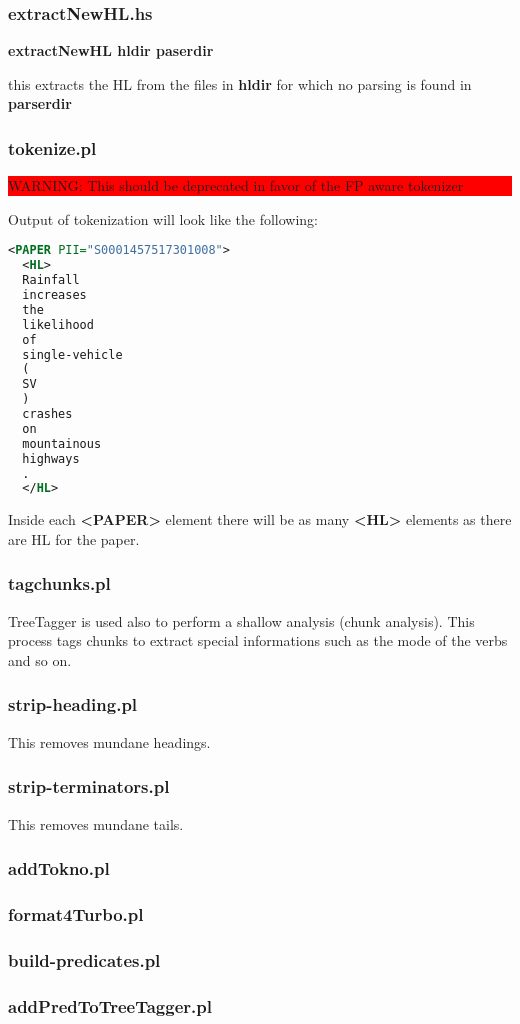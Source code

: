 \documentclass[a4paper,11pt]{report}
\newcommand{\cs}[1]{{\bfseries \ttfamily #1}}
\newcommand{\WARNING}[1]{\begin{center}\bfseries \colorbox{red}{\parbox{0.9\textwidth}{WARNING: #1}}\end{center}}
\begin{document}
\subsubsection{extractNewHL.hs}
\cs{extractNewHL hldir paserdir}

this extracts the HL from the files in \cs{hldir} for which no parsing is found in \cs{parserdir}
%
\subsubsection{tokenize.pl}
\WARNING{This should be deprecated in favor of the FP aware tokenizer}
Output of tokenization will look like the following:
\begin{lstlisting}[language=XML]
  <PAPER PII="S0001457517301008">
  <HL>
  Rainfall
  increases
  the
  likelihood
  of
  single-vehicle
  (
  SV
  )
  crashes
  on
  mountainous
  highways
  .
  </HL>
\end{lstlisting}
Inside each \cs{<PAPER>} element there will be as many \cs{<HL>} elements as there are HL for the paper.
\subsubsection{tagchunks.pl}
TreeTagger is used also to perform a shallow analysis (chunk analysis). This process tags chunks to extract special informations such as the mode of the verbs and so on.
\subsubsection{strip-heading.pl}
This removes mundane headings.
\subsubsection{strip-terminators.pl}
This removes mundane tails.
\subsubsection{addTokno.pl}
\subsubsection{format4Turbo.pl}
\subsubsection{build-predicates.pl}
\subsubsection{addPredToTreeTagger.pl}
\end{document}
